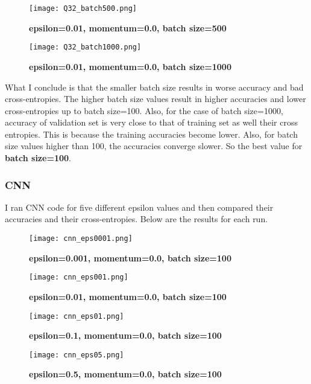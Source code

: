 \documentclass[10pt]{article}
\begin{document}
\begin{figure}[H]
	\centering
	\texttt{[image: Q32\_batch500.png]}
	\caption{\textbf{epsilon=0.01, momentum=0.0, batch size=500}}
	\label{fig:Q32_batch10}
\end{figure}

\begin{figure}[H]
	\centering
	\texttt{[image: Q32\_batch1000.png]}
	\caption{\textbf{epsilon=0.01, momentum=0.0, batch size=1000}}
	\label{fig:Q32_batch10}
\end{figure}

What I conclude is that the smaller batch size results in worse accuracy and bad cross-entropies. The higher batch size values result in higher accuracies and lower cross-entropies up to batch size=100. Also, for the case of batch size=1000, accuracy of validation set is very close to that of training set as well their cross entropies. This is because the training accuracies become lower. Also, for batch size values higher than 100, the accuracies converge slower. So the best value for \textbf{batch size=100}.

\subsubsection*{CNN}
I ran CNN code for five different epsilon values and then compared their accuracies and their cross-entropies. Below are the results for each run.
\begin{figure}[H]
	\centering
	\texttt{[image: cnn\_eps0001.png]}
	\caption{\textbf{epsilon=0.001, momentum=0.0, batch size=100}}
	\label{fig:Q32_batch10}
\end{figure}


\begin{figure}[H]
	\centering
	\texttt{[image: cnn\_eps001.png]}
	\caption{\textbf{epsilon=0.01, momentum=0.0, batch size=100}}
	\label{fig:}
\end{figure}


\begin{figure}[H]
	\centering
	\texttt{[image: cnn\_eps01.png]}
	\caption{\textbf{epsilon=0.1, momentum=0.0, batch size=100}}
	\label{fig:}
\end{figure}


\begin{figure}[H]
	\centering
	\texttt{[image: cnn\_eps05.png]}
	\caption{\textbf{epsilon=0.5, momentum=0.0, batch size=100}}
	\label{fig:}
\end{figure}
\end{document}
